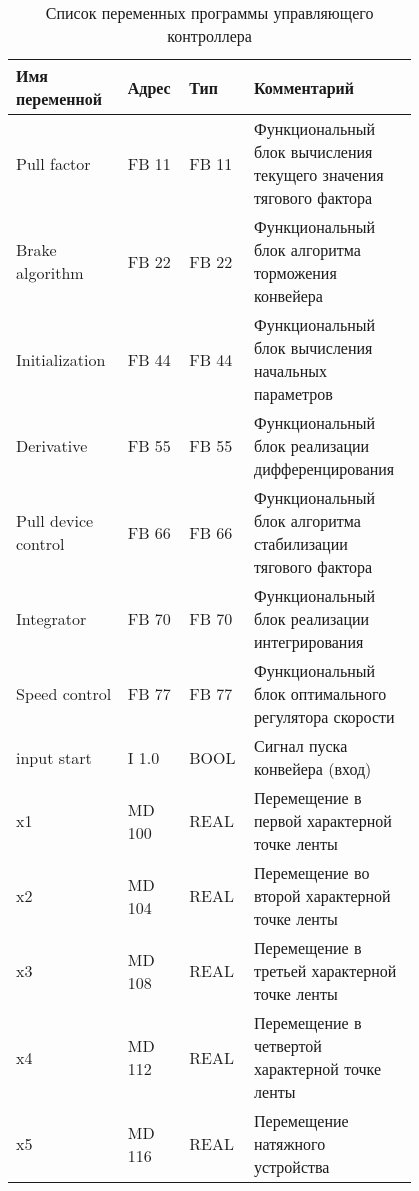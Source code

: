 \begin{table}[h!]
\caption{Список переменных программы управляющего контроллера}
\label{5.tabl:variables}
 
\begin{center}
\begin{tabular}{|p{0.25\linewidth}|p{0.1\linewidth}|p{0.1\linewidth}|p{0.35\linewidth}|}
\hline
Имя переменной           & Адрес  & Тип    &  Комментарий                                                 \\
\hline
Pull factor              & FB 11  & FB 11  & Функциональный блок вычисления текущего значения тягового фактора \\
\hline 
Brake algorithm          & FB 22  & FB 22  & Функциональный блок алгоритма торможения конвейера           \\
\hline 
Initialization           & FB 44  & FB 44  & Функциональный блок вычисления начальных параметров          \\
\hline 
Derivative               & FB 55  & FB 55  & Функциональный блок реализации дифференцирования             \\
\hline 
Pull device control      & FB 66  & FB 66  & Функциональный блок алгоритма стабилизации тягового фактора  \\
\hline 
Integrator               & FB 70  & FB 70  & Функциональный блок реализации интегрирования                \\
\hline  
Speed control            & FB 77  & FB 77  & Функциональный блок оптимального регулятора скорости         \\
\hline   
input start              & I  1.0 & BOOL   & Сигнал пуска конвейера (вход)                                \\
\hline    
x1                       & MD 100 & REAL   & Перемещение в первой характерной точке ленты                 \\
\hline  
x2                       & MD 104 & REAL   & Перемещение во второй характерной точке ленты                \\
\hline  
x3                       & MD 108 & REAL   & Перемещение в третьей характерной точке ленты                \\
\hline  
x4                       & MD 112 & REAL   & Перемещение в четвертой характерной точке ленты              \\
\hline  
x5                       & MD 116 & REAL   & Перемещение натяжного устройства                             \\
\hline  
 

\end{tabular}
\end{center}
\end{table}


